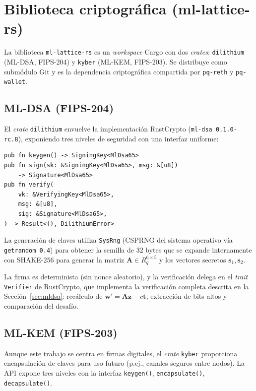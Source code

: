 \section{Biblioteca criptográfica (ml-lattice-rs)}
\label{sec:dev_mllattice}

La biblioteca \texttt{ml-lattice-rs} es un \emph{workspace} Cargo con dos \emph{crates}: \texttt{dilithium} (ML-DSA, FIPS-204) y \texttt{kyber} (ML-KEM, FIPS-203). Se distribuye como submódulo Git y es la dependencia criptográfica compartida por \texttt{pq-reth} y \texttt{pq-wallet}.

\subsection{ML-DSA (FIPS-204)}

El \emph{crate} \texttt{dilithium} envuelve la implementación RustCrypto (\texttt{ml-dsa 0.1.0-rc.8}), exponiendo tres niveles de seguridad con una interfaz uniforme:

\begin{lstlisting}[style=rustcode, caption={Interfaz de ml-lattice-rs para ML-DSA-65.}, label={lst:mldsa_api}]
pub fn keygen() -> SigningKey<MlDsa65>
pub fn sign(sk: &SigningKey<MlDsa65>, msg: &[u8])
    -> Signature<MlDsa65>
pub fn verify(
    vk: &VerifyingKey<MlDsa65>,
    msg: &[u8],
    sig: &Signature<MlDsa65>,
) -> Result<(), DilithiumError>
\end{lstlisting}

La generación de claves utiliza \texttt{SysRng} (CSPRNG del sistema operativo vía \texttt{getrandom 0.4}) para obtener la semilla de 32 bytes que se expande internamente con SHAKE-256 para generar la matriz $\mathbf{A} \in R_q^{6 \times 5}$ y los vectores secretos $\mathbf{s}_1, \mathbf{s}_2$.

La firma es determinista (sin nonce aleatorio), y la verificación delega en el \emph{trait} \texttt{Verifier} de RustCrypto, que implementa la verificación completa descrita en la Sección~\ref{sec:mldsa}: recálculo de $\mathbf{w}' = \mathbf{A}\mathbf{z} - c\mathbf{t}$, extracción de bits altos y comparación del desafío.

\subsection{ML-KEM (FIPS-203)}

Aunque este trabajo se centra en firmas digitales, el \emph{crate} \texttt{kyber} proporciona encapsulación de claves para uso futuro (p.ej., canales seguros entre nodos). La API expone tres niveles con la interfaz \texttt{keygen()}, \texttt{encapsulate()}, \texttt{decapsulate()}.

